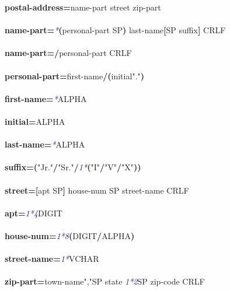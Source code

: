 \documentclass{article}
\begin{document}
{\footnotesize\ttfamily
\textbf{postal-address}\textbf{=}name-part street zip-part\\
\\
\textbf{name-part}\textbf{=}\textcolor{MidnightBlue}{\emph{*}}\textbf{(}personal-part SP\textbf{)} last-name\textbf{[}SP suffix\textbf{]} CRLF\\
\\
\textbf{name-part}\textbf{=/}personal-part CRLF\\
\\
\textbf{personal-part}\textbf{=}first-name\textbf{/}\textbf{(}initial\textcolor{BrickRed}{"."}\textbf{)}\\
\\
\textbf{first-name}\textbf{=}\textcolor{MidnightBlue}{\emph{*}}ALPHA\\
\\
\textbf{initial}\textbf{=}ALPHA\\
\\
\textbf{last-name}\textbf{=}\textcolor{MidnightBlue}{\emph{*}}ALPHA\\
\\
\textbf{suffix}\textbf{=}\textbf{(}\textcolor{BrickRed}{"Jr."}\textbf{/}\textcolor{BrickRed}{"Sr."}\textbf{/}\textcolor{MidnightBlue}{\emph{1*}}\textbf{(}\textcolor{BrickRed}{"I"}\textbf{/}\textcolor{BrickRed}{"V"}\textbf{/}\textcolor{BrickRed}{"X"}\textbf{)}\textbf{)}\\
\\
\textbf{street}\textbf{=}\textbf{[}apt SP\textbf{]} house-num SP street-name CRLF\\
\\
\textbf{apt}\textbf{=}\textcolor{MidnightBlue}{\emph{1*4}}DIGIT\\
\\
\textbf{house-num}\textbf{=}\textcolor{MidnightBlue}{\emph{1*8}}\textbf{(}DIGIT\textbf{/}ALPHA\textbf{)}\\
\\
\textbf{street-name}\textbf{=}\textcolor{MidnightBlue}{\emph{1*}}VCHAR\\
\\
\textbf{zip-part}\textbf{=}town-name\textcolor{BrickRed}{","}SP state \textcolor{MidnightBlue}{\emph{1*2}}SP zip-code CRLF\\
\\

}
\end{document}
